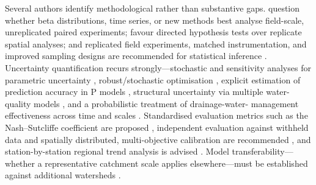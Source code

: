 Several authors identify methodological rather than substantive gaps.
\textcite{Pagliari2021} question whether beta distributions, time series, or new
methods best analyse field-scale, unreplicated paired experiments;
\textcite{Andrus2014} favour directed hypothesis tests over replicate spatial
analyses; and replicated field experiments, matched instrumentation, and improved
sampling designs are recommended for statistical inference
\parencite{Okuda2020,Wamono2016b,Davis2019,Jacquemin2020}. Uncertainty
quantification recurs strongly---stochastic and sensitivity analyses for
parametric uncertainty \parencite{Gates2002,Burkhalter2006}, robust/stochastic
optimisation \parencite{Lei2026}, explicit estimation of prediction accuracy in P
models \parencite{Radcliffe2015}, structural uncertainty via multiple water-quality
models \parencite{Kujawa2020}, and a probabilistic treatment of drainage-water-
management effectiveness across time and scales \parencite{Shedekar2021}.
Standardised evaluation metrics such as the Nash--Sutcliffe coefficient are
proposed \parencite{STONE1995,SAVABI1995,Nazari2021}, independent evaluation
against withheld data and spatially distributed, multi-objective calibration are
recommended \parencite{Schoups2005}, and station-by-station regional trend
analysis is advised \parencite{Kumar2009}. Model transferability---whether a
representative catchment scale applies elsewhere---must be established against
additional watersheds \parencite{Basu2010,Thomas2016}.

